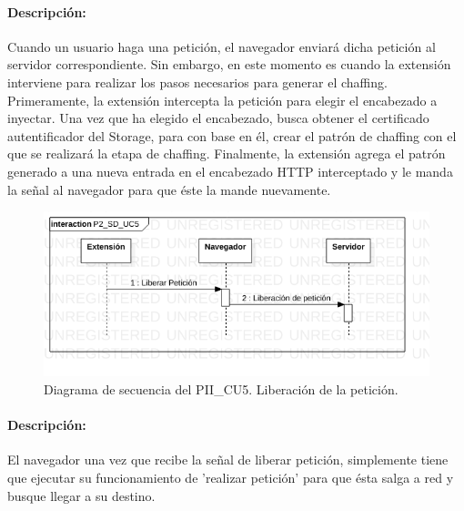 \documentclass[12pt, a4paper, titlepage]{report}
\begin{document}
    			\paragraph{Descripción:}
    			Cuando un usuario haga una petición, el navegador enviará dicha petición al servidor correspondiente. Sin embargo, en este momento es cuando la extensión interviene para realizar los pasos necesarios para generar el chaffing. Primeramente, la extensión intercepta la petición para elegir el encabezado a inyectar. Una vez que ha elegido el encabezado, busca obtener el certificado autentificador del Storage, para con base en él, crear el patrón de chaffing con el que se realizará la etapa de chaffing. Finalmente, la extensión agrega el patrón generado a una nueva entrada en el encabezado HTTP interceptado y le manda la señal al navegador para que éste la mande nuevamente. 
    			
    			\begin{figure}[H]
    				\begin{center}    		    	\includegraphics[width=15cm]{./imagenes/Desarrollo/Prototipo_2/P2_SD_UC5.png}
    				\caption[Diagrama de secuencia 5 del Prototipo II]{Diagrama de secuencia del PII\_CU5. Liberación de la petición.}
    				\end{center}
    			\end{figure}
    		
    		    \paragraph{Descripción:}
    		    El navegador una vez que recibe la señal de liberar petición, simplemente tiene que ejecutar su funcionamiento de 'realizar petición' para que ésta salga a red y busque llegar a su destino.
    		
\end{document}
